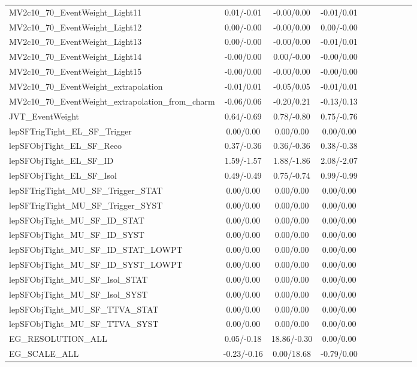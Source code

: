 \begin{table}[h]
\begin{center}
\begin{tabular}{l|ccccccccc}
MV2c10\_70\_EventWeight\_Light11 &0.01/-0.01 &-0.00/0.00 &-0.01/0.01 \\
MV2c10\_70\_EventWeight\_Light12 &0.00/-0.00 &-0.00/0.00 &0.00/-0.00 \\
MV2c10\_70\_EventWeight\_Light13 &0.00/-0.00 &-0.00/0.00 &-0.01/0.01 \\
MV2c10\_70\_EventWeight\_Light14 &-0.00/0.00 &0.00/-0.00 &-0.00/0.00 \\
MV2c10\_70\_EventWeight\_Light15 &-0.00/0.00 &-0.00/0.00 &-0.00/0.00 \\
MV2c10\_70\_EventWeight\_extrapolation &-0.01/0.01 &-0.05/0.05 &-0.01/0.01 \\
MV2c10\_70\_EventWeight\_extrapolation\_from\_charm &-0.06/0.06 &-0.20/0.21 &-0.13/0.13 \\
JVT\_EventWeight &0.64/-0.69 &0.78/-0.80 &0.75/-0.76 \\
lepSFTrigTight\_EL\_SF\_Trigger &0.00/0.00 &0.00/0.00 &0.00/0.00 \\
lepSFObjTight\_EL\_SF\_Reco &0.37/-0.36 &0.36/-0.36 &0.38/-0.38 \\
lepSFObjTight\_EL\_SF\_ID &1.59/-1.57 &1.88/-1.86 &2.08/-2.07 \\
lepSFObjTight\_EL\_SF\_Isol &0.49/-0.49 &0.75/-0.74 &0.99/-0.99 \\
lepSFTrigTight\_MU\_SF\_Trigger\_STAT &0.00/0.00 &0.00/0.00 &0.00/0.00 \\
lepSFTrigTight\_MU\_SF\_Trigger\_SYST &0.00/0.00 &0.00/0.00 &0.00/0.00 \\
lepSFObjTight\_MU\_SF\_ID\_STAT &0.00/0.00 &0.00/0.00 &0.00/0.00 \\
lepSFObjTight\_MU\_SF\_ID\_SYST &0.00/0.00 &0.00/0.00 &0.00/0.00 \\
lepSFObjTight\_MU\_SF\_ID\_STAT\_LOWPT &0.00/0.00 &0.00/0.00 &0.00/0.00 \\
lepSFObjTight\_MU\_SF\_ID\_SYST\_LOWPT &0.00/0.00 &0.00/0.00 &0.00/0.00 \\
lepSFObjTight\_MU\_SF\_Isol\_STAT &0.00/0.00 &0.00/0.00 &0.00/0.00 \\
lepSFObjTight\_MU\_SF\_Isol\_SYST &0.00/0.00 &0.00/0.00 &0.00/0.00 \\
lepSFObjTight\_MU\_SF\_TTVA\_STAT &0.00/0.00 &0.00/0.00 &0.00/0.00 \\
lepSFObjTight\_MU\_SF\_TTVA\_SYST &0.00/0.00 &0.00/0.00 &0.00/0.00 \\
EG\_RESOLUTION\_ALL &0.05/-0.18 &18.86/-0.30 &0.00/0.00 \\
EG\_SCALE\_ALL &-0.23/-0.16 &0.00/18.68 &-0.79/0.00 \\

\end{tabular}
\end{center}
\end{table}
